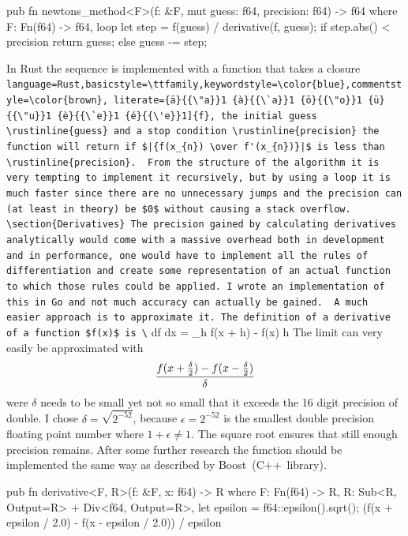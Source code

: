 \documentclass[11pt,DIV=10,final]{scrreprt} %
\providecommand{\rustinline}{\lstinline[language=Rust,basicstyle=\ttfamily,keywordstyle=\color{blue},commentstyle=\color{brown}, literate={ä}{{\"a}}1 {à}{{\`a}}1 {ö}{{\"o}}1 {ü}{{\"u}}1 {è}{{\`e}}1 {é}{{\'e}}1]} % für Inline-C++ Code
\begin{document}
\pagebreak
\begin{rustcode}\nopagebreak
pub fn newtons_method<F>(f: &F, mut guess: f64, precision: f64) -> f64
    where
        F: Fn(f64) -> f64,
{
    loop {
        let step = f(guess) / derivative(f, guess);
        if step.abs() < precision {
            return guess;
        } else {
            guess -= step;
        }
    }
}
\end{rustcode}

In Rust the sequence is implemented with a function that takes a closure \rustinline{f}, the initial guess \rustinline{guess} and a stop condition \rustinline{precision} the function will return if
$|{f(x_{n}) \over f'(x_{n})}|$ is less than \rustinline{precision}.

From the structure of the algorithm it is very tempting to implement it recursively, but by using a loop it is much faster since there are no unnecessary jumps and the precision can (at least in theory) be $0$ without causing a stack overflow.

\section{Derivatives}
The precision gained by calculating derivatives analytically would come with a massive overhead both in development and in performance, one would have to implement all the rules of differentiation and create some representation of an actual function to which those rules could be applied. I wrote an implementation of this in Go and not much accuracy can actually be gained.

A much easier approach is to approximate it. The definition of a derivative of a function $f(x)$ is
\[
  {df \over dx} = \lim_{h }{f(x + h) - f(x) \over h}
\]
The limit can very easily be approximated with
\[
  {f(x + \frac{\delta}{2}) - f(x - \frac{\delta}{2}) \over \delta}
\]
were $\delta$ needs to be small yet not so small that it exceeds the 16 digit precision of double. I chose $\delta = \sqrt{2^{-52}}$, because $\epsilon = 2^{-52}$ is the smallest double precision floating point number where
$1 + \epsilon \ne 1$. The square root ensures that still enough precision remains. After some further research the function should be implemented the same way as described by Boost~(C++~library).

\pagebreak
\begin{rustcode}
pub fn derivative<F, R>(f: &F, x: f64) -> R
    where
        F: Fn(f64) -> R,
        R: Sub<R, Output=R> + Div<f64, Output=R>,
{
    let epsilon = f64::epsilon().sqrt();
    (f(x + epsilon / 2.0) - f(x - epsilon / 2.0)) / epsilon
}
\end{rustcode}
\end{document}
